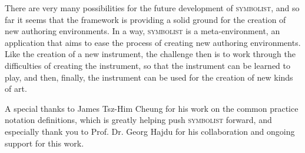 \documentclass{article}
\def\symbolist{\textsc{symbolist}\xspace}
\begin{document}
There are very many possibilities for the future development of \symbolist, and so far it seems that the framework is providing a solid ground for the creation of new authoring environments. In a way, \symbolist is a meta-environment, an application that aims to ease the process of creating new authoring environments.
Like the creation of a new instrument, the challenge then is to work through the difficulties of creating the instrument, so that the instrument can be learned to play, and then, finally, the instrument can be used for the creation of new kinds of art.

\begin{acknowledgments}

A special thanks to James Tsz-Him Cheung for his work on the common practice notation definitions, which is greatly helping push \symbolist forward, and especially thank you to Prof. Dr. Georg Hajdu for his collaboration and ongoing support for this work.

\end{acknowledgments} 

\balance %

\end{document}
